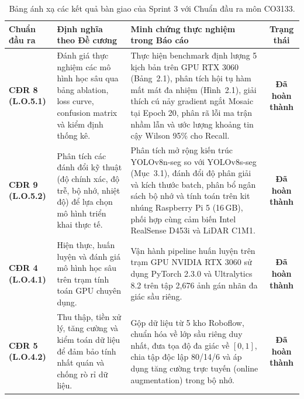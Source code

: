 \documentclass[12pt,a4paper]{article}
\begin{document}
\begin{table}[htbp]
\centering
\small
\caption{Bảng ánh xạ các kết quả bàn giao của Sprint 3 với Chuẩn đầu ra môn CO3133.}
\label{tab:cdr_front_mapping}
\begin{tabularx}{\textwidth}{l p{3.8cm} X c}
\toprule
\textbf{Chuẩn đầu ra} & \textbf{Định nghĩa theo Đề cương} & \textbf{Minh chứng thực nghiệm trong Báo cáo} & \textbf{Trạng thái} \\
\midrule
\textbf{CĐR 8 (L.O.5.1)} & Đánh giá thực nghiệm các mô hình học sâu qua bảng ablation, loss curve, confusion matrix và kiểm định thống kê. & Thực hiện benchmark định lượng 5 kịch bản trên GPU RTX 3060 (Bảng~2.1), phân tích hội tụ hàm mất mát đa nhiệm (Hình~2.1), giải thích cú nảy gradient ngắt Mosaic tại Epoch 20, phân rã lỗi ma trận nhầm lẫn và ước lượng khoảng tin cậy Wilson 95\% cho Recall. & \textbf{Đã hoàn thành} \\
\addlinespace
\textbf{CĐR 9 (L.O.5.2)} & Phân tích các đánh đổi kỹ thuật (độ chính xác, độ trễ, bộ nhớ, nhiệt độ) để lựa chọn mô hình triển khai thực tế. & Phân tích mở rộng kiến trúc YOLOv8n-seg so với YOLOv8s-seg (Mục~3.1), đánh đổi độ phân giải và kích thước batch, phân bổ ngân sách bộ nhớ và tính toán trên kit nhúng Raspberry Pi 5 (16\,GB), phối hợp cùng cảm biến Intel RealSense D453i và LiDAR C1M1. & \textbf{Đã hoàn thành} \\
\addlinespace
\textbf{CĐR 4 (L.O.4.1)} & Hiện thực, huấn luyện và đánh giá mô hình học sâu trên trạm tính toán GPU chuyên dụng. & Vận hành pipeline huấn luyện trên trạm GPU NVIDIA RTX 3060 sử dụng PyTorch 2.3.0 và Ultralytics 8.2 trên tập 2,676 ảnh gán nhãn đa giác sầu riêng. & \textbf{Đã hoàn thành} \\
\addlinespace
\textbf{CĐR 5 (L.O.4.2)} & Thu thập, tiền xử lý, tăng cường và kiểm toán dữ liệu để đảm bảo tính nhất quán và chống rò rỉ dữ liệu. & Gộp dữ liệu từ 5 kho Roboflow, chuẩn hóa về lớp sầu riêng duy nhất, đưa tọa độ đa giác về $[0, 1]$, chia tập độc lập 80/14/6 và áp dụng tăng cường trực tuyến (online augmentation) trong bộ nhớ. & \textbf{Đã hoàn thành} \\
\bottomrule
\end{tabularx}
\end{table}

\newpage
\vspace{0.4cm}
\tableofcontents
\vspace{0.4cm}
\listoftables
\vspace{0.4cm}
\listoffigures

\newpage
{}
\end{document}
